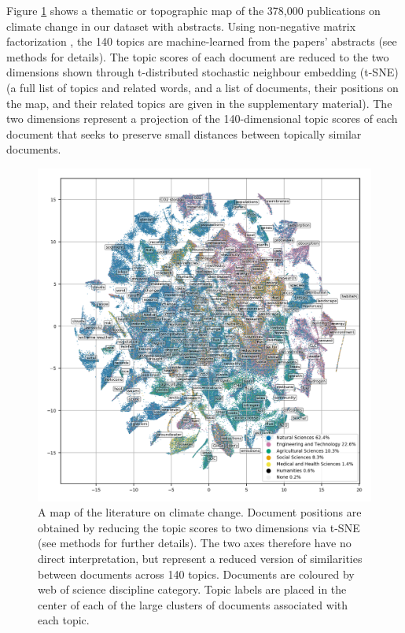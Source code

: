 \documentclass{article}
\begin{document}
\begin{linenumbers}
		
		
		Figure \ref{oecd_topic_map} shows a thematic or topographic map of the 378,000 publications on climate change in our dataset with abstracts. Using non-negative matrix factorization \cite{Lee1999}, the 140 topics are machine-learned from the papers' abstracts (see methods for details). The topic scores of each document are reduced to the two dimensions shown through t-distributed stochastic neighbour embedding (t-SNE) \cite{vandermaaten2008} (a full list of topics and related words, and a list of documents, their positions on the map, and their related topics are given in the supplementary material). The two dimensions represent a projection of the 140-dimensional topic scores of each document that seeks to preserve small distances between topically similar documents.
		
		
		\begin{figure}[htp]
			\begin{center}
				\includegraphics[width=180mm]{../plots_pub/all_topic_words_oecds.png}
				\caption{A map of the literature on climate change. Document positions are obtained by reducing the topic scores to two dimensions via t-SNE (see methods for further details). The two axes therefore have no direct interpretation, but represent a reduced version of similarities between documents across 140 topics. Documents are coloured by web of science discipline category. Topic labels are placed in the center of each of the large clusters of documents associated with each topic. }
				\label{oecd_topic_map}
			\end{center}
		\end{figure}
		

\end{linenumbers}
\end{document}
